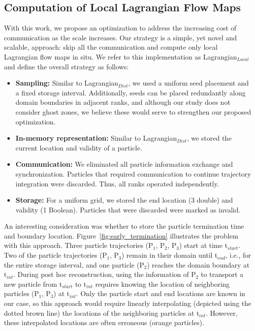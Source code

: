 %
\vspace{-2mm}
\subsection{Computation of Local Lagrangian Flow Maps}
\label{sec:local}
%
With this work, we propose an optimization to address the increasing cost of communication as the scale increases.
%
Our strategy is a simple, yet novel and scalable, approach: skip all the communication and compute only local Lagrangian flow maps in situ. 
%
We refer to this implementation as Lagrangian$_{Local}$ and define the overall strategy as follows:
\vspace{-1mm}
\begin{itemize}[leftmargin=*]
\item\textbf{Sampling:} Similar to Lagrangian$_{Dist}$, we used a uniform seed placement and a fixed storage interval.
%
Additionally, seeds can be placed redundantly along domain boundaries in adjacent ranks, and although our study does not consider ghost zones, we believe these would serve to strengthen our proposed optimization.
%
\item\textbf{In-memory representation:} Similar to Lagrangian$_{Dist}$, we stored the current location and validity of a particle.
%
\item\textbf{Communication:} We eliminated all particle information exchange and synchronization. Particles that required communication to continue trajectory integration were discarded. Thus, all ranks operated independently.
%
\item\textbf{Storage:} For a uniform grid, we stored the end location (3 double) and validity (1 Boolean). Particles that were discarded were marked as invalid. 
%
\vspace{-1mm}
\end{itemize}

%
An interesting consideration was whether to store the particle termination time and boundary location.
%
Figure~\ref{fig:early_termination} illustrates the problem with this approach.
%
Three particle trajectories (P$_{1}$, P$_{2}$, P$_{3}$) start at time t$_{start}$.
%
Two of the particle trajectories (P$_{1}$, P$_{3}$) remain in their domain until t$_{end}$, i.e., for the entire storage interval, and one particle (P$_{2}$) reaches the domain boundary at t$_{int}$.
%
During post hoc reconstruction, using the information of P$_{2}$ to transport a new particle from t$_{start}$ to t$_{int}$ requires knowing the location of neighboring particles (P$_{1}$, P$_{3}$) at t$_{int}$.
%
Only the particle start and end locations are known in our case, so this approach would require linearly interpolating (depicted using the dotted brown line) the locations of the neighboring particles at t$_{int}$.
%
However, these interpolated locations are often erroneous (orange particles).
%


